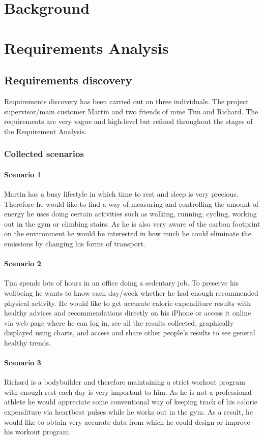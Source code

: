 \documentclass[12pt, a4paper]{report}   %
\begin{document}
\chapter{Background}

\chapter{Requirements Analysis}

\section{Requirements discovery}
Requirements discovery has been carried out on three individuals. The project supervisor/main customer Martin and two friends of mine Tim and Richard. The requirements are very vague and high-level but refined throughout the stages of the Requirement Analysis.

\subsection{Collected scenarios}
\subsubsection*{Scenario 1}
Martin has a busy lifestyle in which time to rest and sleep is very precious. Therefore he would like to find a way of measuring and controlling the amount of energy he uses doing certain activities such as walking, running, cycling, working out in the gym or climbing stairs. As he is also very aware of the carbon footprint on the environment he would be interested in how much he could eliminate the emissions by changing his forms of transport.

\subsubsection*{Scenario 2}
Tim spends lots of hours in an office doing a sedentary job. To preserve his wellbeing he wants to know each day/week whether he had enough recommended physical activity. He would like to get accurate calorie expenditure results with healthy advices and recommendations directly on his iPhone or access it online via web page where he can log in, see all the results collected, graphically displayed using charts, and access and share other people’s results to see general healthy trends.


\subsubsection*{Scenario 3}
Richard is a bodybuilder and therefore maintaining a strict workout program with enough rest each day is very important to him. As he is not a professional athlete he would appreciate some conventional way of keeping track of his calorie expenditure via heartbeat pulses while he works out in the gym. As a result, he would like to obtain very accurate data from which he could design or improve his workout program.
\end{document}
